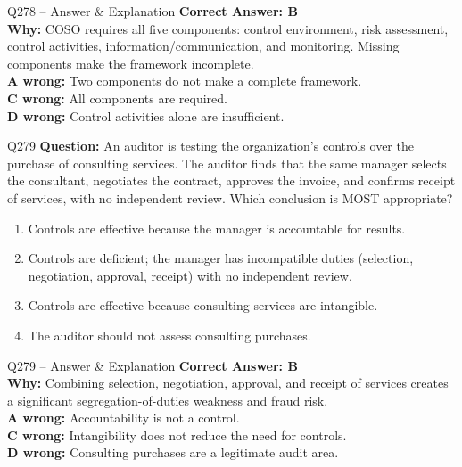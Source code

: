 \documentclass[aspectratio=169,10pt]{beamer}
\begin{document}
	\begin{frame}[t]{Q278 -- Answer \& Explanation}
		\small
		\textbf{Correct Answer: B} \\[4pt]
		\textbf{Why:} COSO requires all five components: control environment, risk assessment, control activities, information/communication, and monitoring. Missing components make the framework incomplete. \\[4pt]
		\textbf{A wrong:} Two components do not make a complete framework. \\[2pt]
		\textbf{C wrong:} All components are required. \\[2pt]
		\textbf{D wrong:} Control activities alone are insufficient.
	\end{frame}
	
	\begin{frame}[t]{Q279}
		\small
		\textbf{Question:} An auditor is testing the organization's controls over the purchase of consulting services. The auditor finds that the same manager selects the consultant, negotiates the contract, approves the invoice, and confirms receipt of services, with no independent review. Which conclusion is MOST appropriate?
		\begin{enumerate}[label=\Alph*.,itemsep=1pt,topsep=2pt]
			\item Controls are effective because the manager is accountable for results.
			\item Controls are deficient; the manager has incompatible duties (selection, negotiation, approval, receipt) with no independent review.
			\item Controls are effective because consulting services are intangible.
			\item The auditor should not assess consulting purchases.
		\end{enumerate}
	\end{frame}
	
	\begin{frame}[t]{Q279 -- Answer \& Explanation}
		\small
		\textbf{Correct Answer: B} \\[4pt]
		\textbf{Why:} Combining selection, negotiation, approval, and receipt of services creates a significant segregation-of-duties weakness and fraud risk. \\[4pt]
		\textbf{A wrong:} Accountability is not a control. \\[2pt]
		\textbf{C wrong:} Intangibility does not reduce the need for controls. \\[2pt]
		\textbf{D wrong:} Consulting purchases are a legitimate audit area.
	\end{frame}
	
\end{document}
